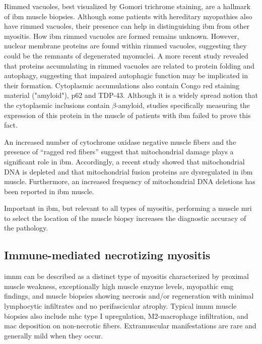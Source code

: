 Rimmed vacuoles, best visualized by Gomori trichrome staining, are a hallmark of \gls{ibm} muscle biopsies. Although some patients with hereditary myopathies also have rimmed vacuoles, their presence can help in distinguishing \gls{ibm} from other myositis.\cite{Dalakas2002} How \gls{ibm} rimmed vacuoles are formed remains unknown. However, nuclear membrane proteins are found within rimmed vacuoles, suggesting they could be the remnants of degenerated myonuclei.\cite{Greenberg2006,Nalbantoglu1994} A more recent study revealed that proteins accumulating in rimmed vacuoles are related to protein folding and autophagy, suggesting that impaired autophagic function may be implicated in their formation.\cite{Guttsches2017} Cytoplasmic accumulations also contain Congo red staining material ("amyloid"), p62 and TDP-43.\cite{Dalakas2002} Although it is a widely spread notion that the cytoplasmic inclusions contain $\beta$-amyloid, studies specifically measuring the expression of this protein in the muscle of patients with \gls{ibm} failed to prove this fact.\cite{Greenberg2010,Nalbantoglu1994}

An increased number of cytochrome oxidase negative muscle fibers and the presence of “ragged red fibers” suggest that mitochondrial damage plays a significant role in \gls{ibm}.\cite{Dalakas2002} Accordingly, a recent study showed that mitochondrial DNA is depleted and that mitochondrial fusion proteins are dysregulated in \gls{ibm} muscle.\cite{CatalanGarcia2016} Furthermore, an increased frequency of mitochondrial DNA deletions has been reported in \gls{ibm} muscle.\cite{Rygiel2016}

Important in \gls{ibm}, but relevant to all types of myositis, performing a muscle \gls{mri} to select the location of the muscle biopsy increases the diagnostic accuracy of the pathology.\cite{VanDeVlekkert2015}

\subsection{Immune-mediated necrotizing myositis}

\gls{imnm} can be described as a distinct type of myositis characterized by proximal muscle weakness, exceptionally high muscle enzyme levels, myopathic \gls{emg} findings, and muscle biopsies showing necrosis and/or regeneration with minimal lymphocytic infiltrates and no perifascicular atrophy. Typical \gls{imnm} muscle biopsies also include \gls{mhc} type I upregulation, M2-macrophage infiltration, and \gls{mac} deposition on non-necrotic fibers.\cite{Watanabe2016,Chung2015} Extramuscular manifestations are rare and generally mild when they occur.\cite{PinalFernandez2017b,Suzuki2015,Tiniakou2017}

